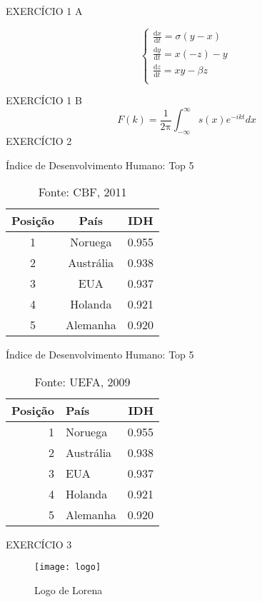 \documentclass[a4paper, 12pt]{article}
\begin{document}
	\centering EXERCÍCIO 1 A

	\begin{equation}
		\begin{cases}
		\frac{\mathrm{d}x}{\mathrm{d}t} = \sigma(y-x) \\
		\frac{\mathrm{d}y}{\mathrm{d}t} = x(-z)-y \\
		\frac{\mathrm{d}z}{\mathrm{d}t} = xy - \beta z \\
		\end{cases}
	\end{equation}

	\centering EXERCÍCIO 1 B
	\begin{equation}
	\ F(k) = \frac{\mathrm{1}}{\mathrm{2\pi}} \int_{{-\infty}}^{{\infty}} s(x)e^{-ikt} dx
	\end{equation}
	\centering EXERCÍCIO 2
	\begin{table}[!h]
		\centering
		\caption{Índice de Desenvolvimento Humano: Top 5}
		\begin{tabular}{ccc}
		\toprule
			Posição & País & IDH \\
		\midrule
			1 & Noruega & 0.955 \\
			2 & Austrália & 0.938 \\
			3 & EUA & 0.937 \\
			4 & Holanda & 0.921 \\
			5 & Alemanha & 0.920 \\
		\bottomrule
		\end{tabular}
	\vspace{0,1cm}
		\caption*{Fonte: CBF, 2011}
	\end{table}

	\begin{table}[h]
		\centering
		\caption{ Índice de Desenvolvimento Humano: Top 5}
		\vspace{0.5cm}
		\begin{tabular}{r|lr}

			Posição  & País & IDH \\ %
			\hline
			\vspace{0.1cm}                               %
			1 & Noruega        &  0.955 \\
			2 & Austrália      &  0.938 \\
			3 & EUA            & 0.937 \\
			4 & Holanda        & 0.921 \\
			5 & Alemanha       & 0.920 \\           %

		\end{tabular}
	\vspace{0,1cm}
	\caption*{Fonte: UEFA, 2009}

\end{table}

\centering EXERCÍCIO 3
\begin{figure}[H]
	\centering
	\texttt{[image: logo]}
	\caption{Logo de Lorena}
\end{figure}
\end{document}
